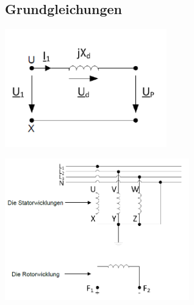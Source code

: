 \subsection{Grundgleichungen}
\begin{minipage}[b]{0.5\linewidth}
\includegraphics[width = 7cm]{images/Wicklung1}
\end{minipage}
\begin{minipage}[b]{0.5\linewidth}
\includegraphics[width = 8cm]{images/Wicklungen}
\end{minipage}
\vspace{-1cm}

